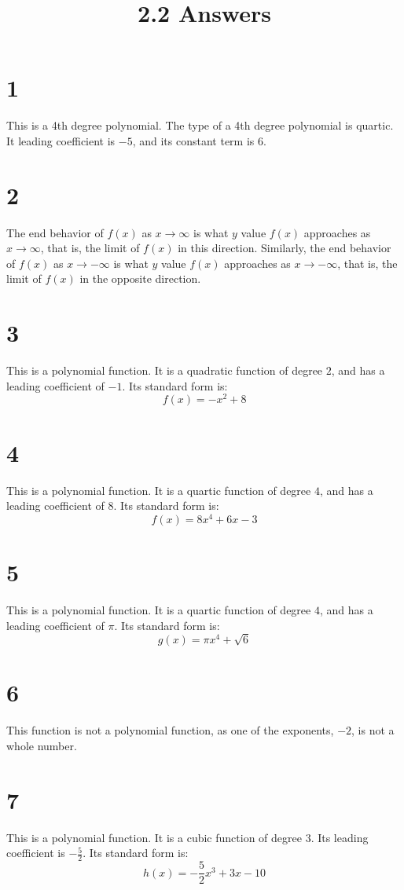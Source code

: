 \documentclass{article}
\title{2.2 Answers}
\theoremstyle{definition}
\begin{document}
\maketitle

\section*{1}
This is a 4th degree polynomial. The type of a 4th degree polynomial is quartic. It leading coefficient is $-5$, and its constant term is $6$.

\section*{2}
The end behavior of $f(x)$ as $x\rightarrow\infty$ is what $y$ value $f(x)$ approaches as $x\rightarrow\infty$, that is, the limit of $f(x)$ in this 
direction. Similarly, the end behavior of $f(x)$ as $x\rightarrow -\infty$ is what $y$ value $f(x)$ approaches as $x\rightarrow -\infty$, that is, 
the limit of $f(x)$ in the opposite direction.

\section*{3}
This is a polynomial function. It is a quadratic function of degree $2$, and has a leading coefficient of $-1$. Its standard form is:
\[ f(x)=-x^2+8 \]

\section*{4}
This is a polynomial function. It is a quartic function of degree $4$, and has a leading coefficient of $8$. Its standard form is:
\[ f(x)=8x^4+6x-3 \]

\section*{5}
This is a polynomial function. It is a quartic function of degree $4$, and has a leading coefficient of $\pi $. Its standard form is:
\[ g(x)=\pi x^4+\sqrt{6} \]

\section*{6}
This function is not a polynomial function, as one of the exponents, $-2$, is not a whole number.

\section*{7}
This is a polynomial function. It is a cubic function of degree $3$. Its leading coefficient is $-\frac{5}{2}$. Its standard form is:
\[ h(x)=-\frac{5}{2}x^3+3x-10 \]
\end{document}
